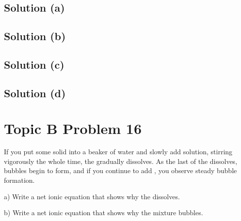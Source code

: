 \documentclass[10pt]{article}
\begin{document}
        \subsection{Solution (a)}
            \begin{center}
            \end{center}

        \subsection{Solution (b)}
            \begin{center}
            \end{center}

        \subsection{Solution (c)}
            \begin{center}
            \end{center}

        \subsection{Solution (d)}
            \begin{center}
            \end{center}

    \pagebreak
    \section{Topic B Problem 16}
        If you put some solid  into a beaker of water and slowly add  solution, stirring vigorously the whole time, the  gradually dissolves. 
        As the last of the  dissolves, bubbles begin to form, and if you continue to add , you observe steady bubble formation.
        
        a) Write a net ionic equation that shows why the  dissolves.
        
        b) Write a net ionic equation that shows why the mixture bubbles.
\end{document}
